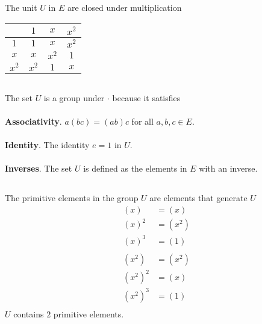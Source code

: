 \documentclass{article}
\begin{document}
\subsection{}
The unit $U$ in $E$ are closed under multiplication
\begin{center}
\begin{tabular}{ c | c | c | c }
& $1$ & $x$ & $x^2$ \\
\hline
$1$ & $1$ & $x$ & $x^2$ \\
\hline
$x$ & $x$ & $x^2$ & $1$ \\
\hline
$x^2$ & $x^2$ & $1$ & $x$ \\
\end{tabular}
\end{center}
\subsection{}
The set $U$ is a group under $\cdot$ because it satisfies
\\
\\
\textbf{Associativity}. $a(bc) = (ab)c$ for all $a,b,c \in E$.
\\
\\
\textbf{Identity}. The identity $e = 1$ in $U$.
\\
\\
\textbf{Inverses}. The set $U$ is defined as the elements in $E$ with an inverse.
\subsection{}
The primitive elements in the group $U$ are elements that generate $U$
\[
\begin{split}
(x) &= (x) \\
(x)^2 &= (x^2) \\
(x)^3 &= (1) \\
\\
(x^2) &= (x^2) \\
(x^2)^2 &= (x) \\
(x^2)^3 &= (1) \\
\end{split}
\]
$U$ contains $2$ primitive elements.

\end{document}
